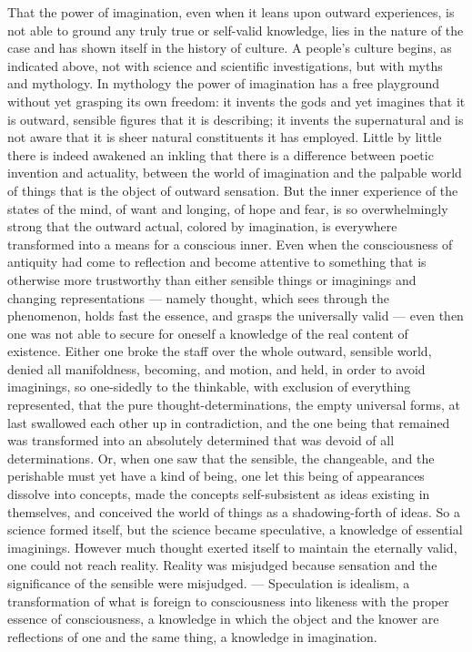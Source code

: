 \documentclass[12pt]{book}
\begin{document}
That the power of imagination, even when it leans upon outward experiences,
is not able to ground any truly true or self-valid knowledge, lies in the
nature of the case and has shown itself in the history of culture. A people's
culture begins, as indicated above, not with science and scientific
investigations, but with myths and mythology. In mythology the power of
imagination has a free playground without yet grasping its own freedom: it
invents the gods and yet imagines that it is outward, sensible figures that it
is describing; it invents the supernatural and is not aware that it is sheer
natural constituents it has employed. Little by little there is indeed
awakened an inkling that there is a difference between poetic invention and
actuality, between the world of imagination and the palpable world of things
that is the object of outward sensation. But the inner experience of the
states of the mind, of want and longing, of hope and fear, is so
overwhelmingly strong that the outward actual, colored by imagination, is
everywhere transformed into a means for a conscious inner. Even when the
consciousness of antiquity had come to reflection and become attentive to
something that is otherwise more trustworthy than either sensible things or
imaginings and changing representations --- namely thought, which sees through
the phenomenon, holds fast the essence, and grasps the universally valid ---
even then one was not able to secure for oneself a knowledge of the real
content of existence. Either one broke the staff over the whole outward,
sensible world, denied all manifoldness, becoming, and motion, and held, in
order to avoid imaginings, so one-sidedly to the thinkable, with exclusion of
everything represented, that the pure thought-determinations, the empty
universal forms, at last swallowed each other up in contradiction, and the one
being that remained was transformed into an absolutely determined that was
devoid of all determinations. Or, when one saw that the sensible, the
changeable, and the perishable must yet have a kind of being, one let this
being of appearances dissolve into concepts, made the concepts self-subsistent
as ideas existing in themselves, and conceived the world of things as a
shadowing-forth of ideas. So a science formed itself, but the science became
speculative, a knowledge of essential imaginings. However much thought
exerted itself to maintain the eternally valid, one could not reach reality.
Reality was misjudged because sensation and the significance of the sensible
were misjudged. --- Speculation is idealism, a transformation of what is
foreign to consciousness into likeness with the proper essence of
consciousness, a knowledge in which the object and the knower are reflections
of one and the same thing, a knowledge in imagination.
\end{document}
